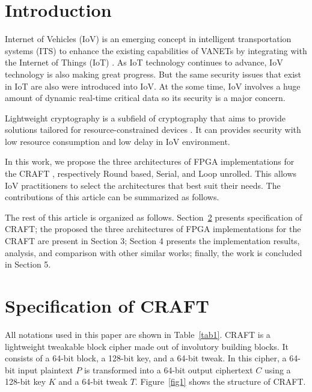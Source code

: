 \documentclass[final,5p,times,twocolumn]{elsarticle}
\begin{document}



\section{Introduction}\label{sec1}

Internet of Vehicles (IoV) is an emerging concept in intelligent transportation systems (ITS) to enhance the existing capabilities of VANETs by integrating with the Internet of Things (IoT) \cite{sharma2019survey}.
As IoT technology continues to advance, IoV technology is also making great progress.
But the same security issues that exist in IoT are also were introduced into IoV.
At the some time, IoV involves a huge amount of dynamic real-time critical data so its security is a major concern.

Lightweight cryptography is a subfield of cryptography that aims to provide solutions tailored for resource-constrained devices \cite{mckay2016report}.
It can provides security with low resource consumption and low delay in IoV environment.

In this work, we propose the three architectures of FPGA implementations for the CRAFT \cite{beierle2019craft}, respectively Round based, Serial, and Loop unrolled.
This allows IoV practitioners to select the architectures that best suit their needs.
The contributions of this article can be summarized as follows.

The rest of this article is organized as follows.
Section~\ref{sec2} presents specification of CRAFT; the proposed the three architectures of FPGA implementations for the CRAFT are present in Section 3; Section 4 presents the implementation results, analysis, and comparison with other similar works; finally, the work is concluded in Section 5.

\section{Specification of CRAFT}\label{sec2}

All notations used in this paper are shown in Table~\ref{tab1}.
CRAFT is a lightweight tweakable block cipher made out of involutory building blocks.
It consists of a 64-bit block, a 128-bit key, and a 64-bit tweak. In this cipher, a 64-bit input plaintext $P$ is transformed into a 64-bit output ciphertext $C$ using a 128-bit key $K$ and a 64-bit tweak $T$. Figure~\ref{fig1} shows the structure of CRAFT.
\end{document}
